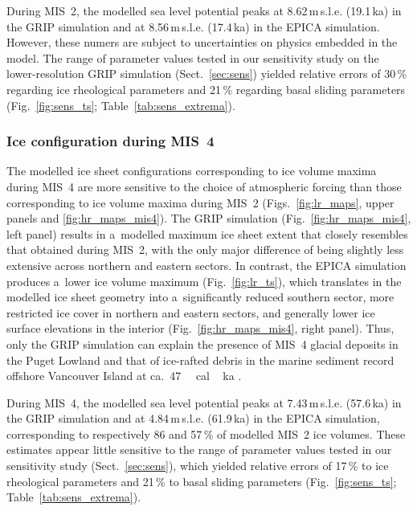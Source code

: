 \documentclass[tc, manuscript]{copernicus}
\begin{document}
      During MIS~2, the modelled sea level potential peaks at
      8.62\,\unit{m}\,s.l.e. (19.1\,\unit{ka}) in the GRIP simulation and at
      8.56\,\unit{m}\,s.l.e. (17.4\,\unit{ka}) in the EPICA simulation.
      However, these numers are subject to uncertainties on physics
      embedded in the model. The range of parameter values tested in our
      sensitivity study on the lower-resolution GRIP simulation
      (Sect.~\ref{sec:sens}) yielded relative errors of 30\,\unit{\%}
      regarding ice rheological parameters and 21\,\unit{\%} regarding basal
      sliding parameters (Fig.~\ref{fig:sens_ts};
      Table~\ref{tab:sens_extrema}).


\subsubsection{Ice configuration during MIS~4}
\label{sec:mis4}

      The modelled ice sheet configurations corresponding to ice volume
      maxima during MIS~4 are more sensitive to the choice of atmospheric
      forcing than those corresponding to ice volume maxima during MIS~2
      (Figs.~\ref{fig:lr_maps}, upper panels and \ref{fig:hr_maps_mis4}).
      The GRIP simulation (Fig.~\ref{fig:hr_maps_mis4}, left panel) results
      in a~modelled maximum ice sheet extent that closely resembles that
      obtained during MIS~2, with the only major difference of being
      slightly less extensive across northern and eastern sectors. In
      contrast, the EPICA simulation produces a~lower ice volume maximum
      (Fig.~\ref{fig:lr_ts}), which translates in the modelled ice sheet
      geometry into a~significantly reduced southern sector, more restricted
      ice cover in northern and eastern sectors, and generally lower ice
      surface elevations in the interior (Fig.~\ref{fig:hr_maps_mis4}, right
      panel). Thus, only the GRIP simulation can explain the presence of
      MIS~4 glacial deposits in the Puget Lowland \citep{Troost.2014} and
      that of ice-rafted debris in the marine sediment record offshore
      Vancouver Island at ca.~47\,\unit{\,cal\,ka}
      \citep{Cosma.etal.2008}.

      During MIS~4, the modelled sea level potential peaks at
      7.43\,\unit{m}\,s.l.e. (57.6\,\unit{ka}) in the GRIP simulation and at
      4.84\,\unit{m}\,s.l.e. (61.9\,\unit{ka}) in the EPICA simulation,
      corresponding to respectively 86 and 57\,\unit{\%} of modelled MIS~2
      ice volumes.
      These estimates appear little sensitive to the range of parameter
      values tested in our sensitivity study (Sect.~\ref{sec:sens}), which
      yielded relative errors of 17\,\unit{\%} to ice rheological parameters
      and 21\,\unit{\%} to basal sliding parameters
      (Fig.~\ref{fig:sens_ts}; Table~\ref{tab:sens_extrema}).
\end{document}
